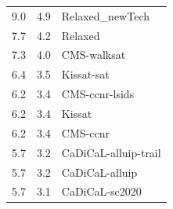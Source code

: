 \documentclass{elsarticle}
\begin{document}
\begin{table}
\begin{center}
\begin{tabular}{ccl}
\hline
9.0 & 4.9 & Relaxed\_newTech \\
7.7 & 4.2 & Relaxed \\
7.3 & 4.0 & CMS-walksat \\
6.4 & 3.5 & Kissat-sat \\
6.2 & 3.4 & CMS-ccnr-lsids \\
6.2 & 3.4 & Kissat \\
6.2 & 3.4 & CMS-ccnr \\
5.7 & 3.2 & CaDiCaL-alluip-trail \\
5.7 & 3.2 & CaDiCaL-alluip \\
5.7 & 3.1 & CaDiCaL-sc2020 \\
\end{tabular}
\end{center}
\end{table}
\end{document}
